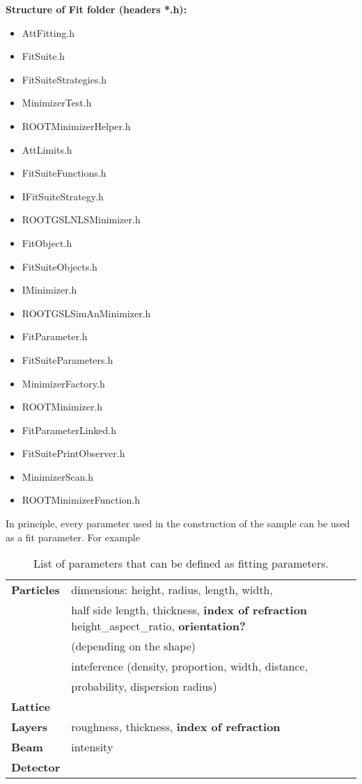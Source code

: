 \textbf{Structure of Fit folder (headers *.h):}
\begin{itemize}
\item AttFitting.h		
\item FitSuite.h		
\item FitSuiteStrategies.h	
\item MinimizerTest.h		
\item ROOTMinimizerHelper.h
\item AttLimits.h		
\item FitSuiteFunctions.h	
\item IFitSuiteStrategy.h	
\item ROOTGSLNLSMinimizer.h
\item FitObject.h		
\item FitSuiteObjects.h	
\item IMinimizer.h		
\item ROOTGSLSimAnMinimizer.h
\item FitParameter.h		
\item FitSuiteParameters.h	
\item MinimizerFactory.h	
\item ROOTMinimizer.h
\item FitParameterLinked.h	
\item FitSuitePrintObserver.h	
\item MinimizerScan.h		
\item ROOTMinimizerFunction.h
\end{itemize}

In principle, every parameter used in the construction of the sample
can be used as a fit parameter. For example

\begin{table}[h]
\centering
\begin{tabular}{|@{}l||l@{}|}
\hline
\textbf{Particles} &  dimensions: height, radius, length, width, \\
                             &  half side length, thickness, \textbf{index of refraction} 
                             height\_aspect\_ratio, \textbf{orientation?} \\
& (depending on the shape) \\
& inteference (density, proportion, width, distance,\\
& probability,
dispersion radius) \\
\hline
\textbf{Lattice} & \\
\hline
\textbf{Layers} & roughness, thickness, \textbf{index of refraction} \\
\hline
\textbf{Beam} & intensity \\
\hline
\textbf{Detector} & \\
\hline
\end{tabular}
\label{table:fitting_parameters}
\caption{List of parameters that can be defined as fitting parameters.}
\end{table}

